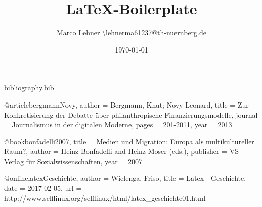 \begin{filecontents}{bibliography.bib}

@article{bergmannNovy,
author = {Bergmann, Knut; Novy Leonard},
title = {Zur Konkretisierung der Debatte über philanthropische Finanzierungsmodelle},
journal = {Journalismus in der digitalen Moderne},
pages = {201-2011},
year = {2013}
}

@book{bonfadelli2007,
   title =     {Medien und Migration: Europa als multikultureller Raum?},
   author =    {Heinz Bonfadelli and Heinz Moser (eds.)},
   publisher = {VS Verlag für Sozialwissenschaften},
   year =      {2007}
}

@online{latexGeschichte,
author = {Wielenga, Friso},
title  = {Latex - Geschichte},
date   = {2017-02-05},
url    = {http://www.selflinux.org/selflinux/html/latex_geschichte01.html}
}

\end{filecontents}


\documentclass[a4paper,11pt]{article}%
\usepackage[german, ngerman]{babel} %
\usepackage[T1] {fontenc} %
\usepackage[utf8]{inputenc} %
\usepackage[babel,german=quotes]{csquotes} %
\usepackage{amsfonts}
\usepackage{listing}
\usepackage{graphicx}%
\usepackage{eurosym}%

\usepackage[
   backend=biber      %
  ,style=verbose-ibid   %
  ,babel=other        %
  ,block=space
]{biblatex}



\title{\LaTeX -Boilerplate}
\author{Marco Lehner \textbackslash  lehnerma61237@th-nuernberg.de}
\date{\today}


\maketitle
\newpage
\tableofcontents
\newpage

